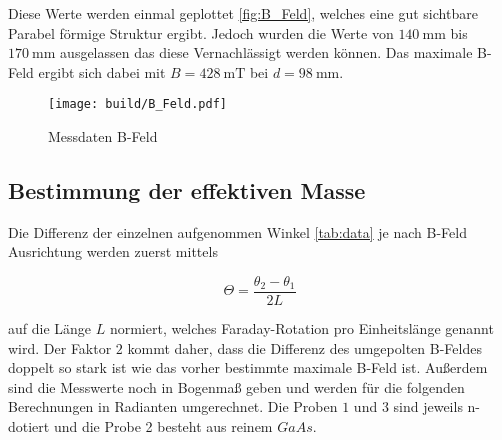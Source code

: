 Diese Werte werden einmal geplottet \eqref{fig:B_Feld}, welches eine gut sichtbare Parabel förmige Struktur ergibt. 
Jedoch wurden die Werte von $\qty{140}{\milli\meter}$ bis $\qty{170}{\milli\meter}$ ausgelassen das diese Vernachlässigt werden können. 
Das maximale B-Feld ergibt sich dabei mit $B=\qty{428}{\milli\tesla}$ bei $d=\qty{98}{\milli\meter}$. 

\begin{figure}[H]
	\centering
	\texttt{[image: build/B\_Feld.pdf]}
	\caption{Messdaten B-Feld}\label{fig:B_Feld}
\end{figure}

\subsection{Bestimmung der effektiven Masse}
Die Differenz der einzelnen aufgenommen Winkel \eqref{tab:data} je nach B-Feld Ausrichtung werden zuerst mittels 

\begin{equation}
    \Theta =\frac{\theta_2 - \theta_1}{2L} 
\end{equation}

auf die Länge $L$ normiert, welches Faraday-Rotation pro Einheitslänge genannt wird.  
Der Faktor $2$ kommt daher, dass die Differenz des umgepolten B-Feldes doppelt so stark ist wie das vorher bestimmte maximale B-Feld ist. 
Außerdem sind die Messwerte noch in Bogenmaß geben und werden für die folgenden Berechnungen in Radianten umgerechnet. 
Die Proben $1$ und $3$ sind jeweils n-dotiert und die Probe 2 besteht aus reinem $GaAs$. 

